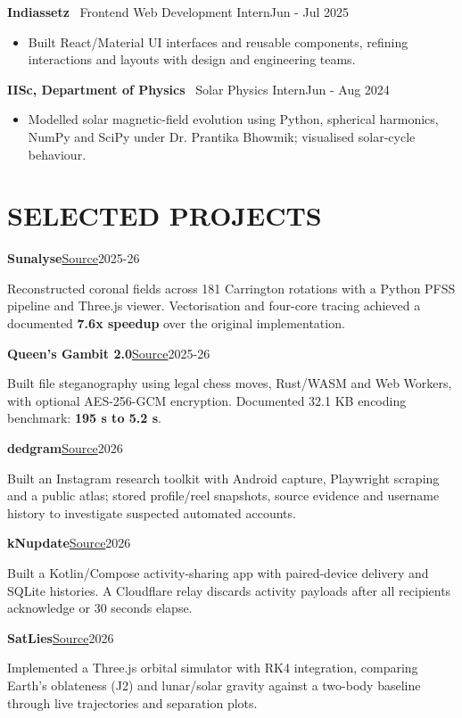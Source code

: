 \documentclass[a4paper,10pt]{article}
\newcommand{\job}[3]{%
  \textbf{#1} {\color{muted}\textbar\ #2}\hfill{\fontsize{9}{11}\selectfont\color{muted}#3}\par
}
\newcommand{\project}[4]{%
  \textbf{#1}\hspace{6pt}\href{#3}{{\fontsize{9}{11}\selectfont Source}}\hfill{\fontsize{9}{11}\selectfont\color{muted}#2}\par
  #4\par\vspace{4pt}
}
\begin{document}
\job{Indiassetz}{Frontend Web Development Intern}{Jun - Jul 2025}
\begin{itemize}
  \item Built React/Material UI interfaces and reusable components, refining interactions and layouts with design and engineering teams.
\end{itemize}
\vspace{3pt}

\job{IISc, Department of Physics}{Solar Physics Intern}{Jun - Aug 2024}
\begin{itemize}
  \item Modelled solar magnetic-field evolution using Python, spherical harmonics, NumPy and SciPy under Dr. Prantika Bhowmik; visualised solar-cycle behaviour.
\end{itemize}

\section{SELECTED PROJECTS}

\project{Sunalyse}{2025-26}{https://github.com/aniruddhballal/sunalyse}{%
Reconstructed coronal fields across 181 Carrington rotations with a Python PFSS pipeline and Three.js viewer. Vectorisation and four-core tracing achieved a documented \textbf{7.6x speedup} over the original implementation.}

\project{Queen's Gambit 2.0}{2025-26}{https://github.com/aniruddhballal/queens-gambit-2.0}{%
Built file steganography using legal chess moves, Rust/WASM and Web Workers, with optional AES-256-GCM encryption. Documented 32.1 KB encoding benchmark: \textbf{195 s to 5.2 s}.}

\project{dedgram}{2026}{https://github.com/aniruddhballal/dedgram}{%
Built an Instagram research toolkit with Android capture, Playwright scraping and a public atlas; stored profile/reel snapshots, source evidence and username history to investigate suspected automated accounts.}

\project{kNupdate}{2026}{https://github.com/aniruddhballal/kNupdate}{%
Built a Kotlin/Compose activity-sharing app with paired-device delivery and SQLite histories. A Cloudflare relay discards activity payloads after all recipients acknowledge or 30 seconds elapse.}

\project{SatLies}{2026}{https://github.com/aniruddhballal/SatLies}{%
Implemented a Three.js orbital simulator with RK4 integration, comparing Earth's oblateness (J2) and lunar/solar gravity against a two-body baseline through live trajectories and separation plots.}
\end{document}
